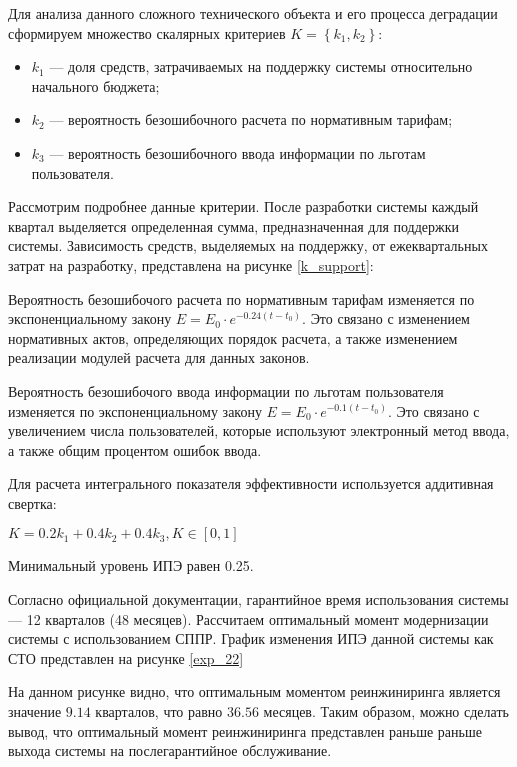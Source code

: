 Для анализа данного сложного технического объекта и его процесса деградации сформируем множество скалярных критериев $K=\left\{k_1,k_2\right\}$:
\begin{itemize}
    \item $k_1$ --- доля средств, затрачиваемых на поддержку системы относительно начального бюджета;
    \item $k_2$ --- вероятность безошибочного расчета по нормативным тарифам;
    \item $k_3$ --- вероятность безошибочного ввода информации по льготам пользователя.
\end{itemize}

Рассмотрим подробнее данные критерии.
После разработки системы каждый квартал выделяется определенная сумма, предназначенная для поддержки системы.
Зависимость средств, выделяемых на поддержку, от ежеквартальных затрат на разработку, представлена на рисунке \ref{k_support}:


Вероятность безошибочого расчета по нормативным тарифам изменяется по экспоненциальному закону $E=E_0 \cdot e^{-0.24(t-t_0)}$.
Это связано с изменением нормативных актов, определяющих порядок расчета, а также изменением реализации модулей расчета для данных законов.

Вероятность безошибочого ввода информации по льготам пользователя изменяется по экспоненциальному закону $E=E_0 \cdot e^{-0.1(t-t_0)}$.
Это связано с увеличением числа пользователей, которые используют электронный метод ввода, а также общим процентом ошибок ввода.

Для расчета интегрального показателя эффективности используется аддитивная свертка:
\begin{center}
$K=0.2k_1+0.4k_2+0.4k_3, K \in [0,1]$
\end{center}

Минимальный уровень ИПЭ равен 0.25.

Согласно официальной документации, гарантийное время использования системы --- 12 кварталов (48 месяцев).
Рассчитаем оптимальный момент модернизации системы с использованием СППР. 
График изменения ИПЭ данной системы как СТО представлен на рисунке \ref{exp_22}

На данном рисунке видно, что оптимальным моментом реинжиниринга является значение $9.14$ кварталов, 
что равно $36.56$ месяцев. 
Таким образом, можно сделать вывод, что оптимальный момент реинжиниринга представлен раньше раньше выхода системы на послегарантийное обслуживание.

